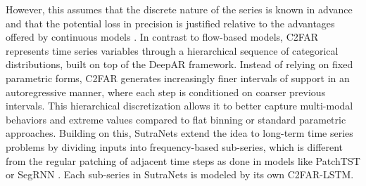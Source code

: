 \documentclass[a4paper,oneside,bibliography=totoc]{scrbook}
\begin{document}
However, this assumes that the discrete nature of the series is known in advance and that the potential loss in precision is justified relative to the advantages offered by continuous models \cite{bergsma_c2far_2022}.
In contrast to flow-based models, C2FAR \cite{bergsma_c2far_2022} 
represents time series variables through a hierarchical sequence of categorical distributions, built on top of the DeepAR framework. Instead of relying on fixed parametric forms, C2FAR generates increasingly finer intervals of support in an autoregressive manner, where each step is conditioned on coarser previous intervals. This hierarchical discretization allows it to better capture multi-modal behaviors and extreme values compared to flat binning or standard parametric approaches.
Building on this, SutraNets \cite{bergsma_sutranets_2023} extend the idea to long-term time series problems by dividing inputs into frequency-based sub-series, which is different from the regular patching of adjacent time steps as done in models like PatchTST \cite{nie_time_2022} or SegRNN \cite{lin_segrnn_2023}. Each sub-series in SutraNets is modeled by its own C2FAR-LSTM.
\end{document}
